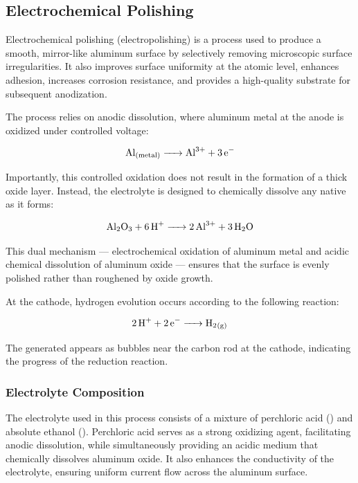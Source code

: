 \documentclass{rapportCS}
\begin{document}
	\subsection{Electrochemical Polishing}
	
	Electrochemical polishing (electropolishing) is a process used to produce a smooth, mirror-like aluminum surface by selectively removing microscopic surface irregularities. It also improves surface uniformity at the atomic level, enhances adhesion, increases corrosion resistance, and provides a high-quality substrate for subsequent anodization.
	
	The process relies on anodic dissolution, where aluminum metal at the anode is oxidized under controlled voltage:
	
	\begin{equation}
		\ce{Al_{(metal)} -> Al^3+ + 3 e^-}
		\label{eq:anodic-dissolution}
	\end{equation}
	
	Importantly, this controlled oxidation does not result in the formation of a thick oxide layer. Instead, the electrolyte is designed to chemically dissolve any native  as it forms:

	\begin{equation}
		\ce{Al2O3 + 6H+ -> 2Al^3+ + 3H2O}
		\label{eq:oxide-dissolution}
	\end{equation}
	
	This dual mechanism — electrochemical oxidation of aluminum metal and acidic chemical dissolution of aluminum oxide — ensures that the surface is evenly polished rather than roughened by oxide growth.
	
	At the cathode, hydrogen evolution occurs according to the following reaction:

	\begin{equation}
		\ce{2 H^+ + 2 e^- -> H2_{(g)}}
		\label{eq:cathodic-reaction}
	\end{equation}

	The generated  appears as bubbles near the carbon rod at the cathode, indicating the progress of the reduction reaction.
	
	\subsubsection{Electrolyte Composition}
	
	The electrolyte used in this process consists of a mixture of perchloric acid () and absolute ethanol (). Perchloric acid serves as a strong oxidizing agent, facilitating anodic dissolution, while simultaneously providing an acidic medium that chemically dissolves aluminum oxide. It also enhances the conductivity of the electrolyte, ensuring uniform current flow across the aluminum surface.
	
\end{document}
